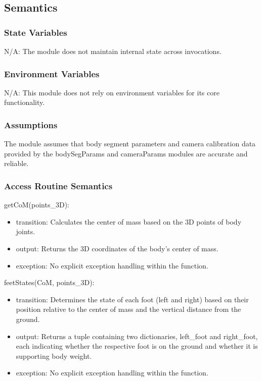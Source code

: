 \documentclass[12pt, titlepage]{article}
\begin{document}
\subsection{Semantics}

\subsubsection{State Variables}
N/A: The module does not maintain internal state across invocations.

\subsubsection{Environment Variables}
N/A: This module does not rely on environment variables for its core functionality.

\subsubsection{Assumptions}
The module assumes that body segment parameters and camera calibration data provided by the bodySegParams and cameraParams modules are accurate and reliable.

\subsubsection{Access Routine Semantics}

\noindent getCoM(points\_3D):
\begin{itemize}
  \item transition: Calculates the center of mass based on the 3D points of body joints.
  \item output: Returns the 3D coordinates of the body's center of mass.
  \item exception: No explicit exception handling within the function.
\end{itemize}

\noindent feetStates(CoM, points\_3D):
\begin{itemize}
  \item transition: Determines the state of each foot (left and right) based on their position relative to the center of mass and the vertical distance from the ground.
  \item output: Returns a tuple containing two dictionaries, left\_foot and right\_foot, each indicating whether the respective foot is on the ground and whether it is supporting body weight.
  \item exception: No explicit exception handling within the function.
\end{itemize}
\end{document}
